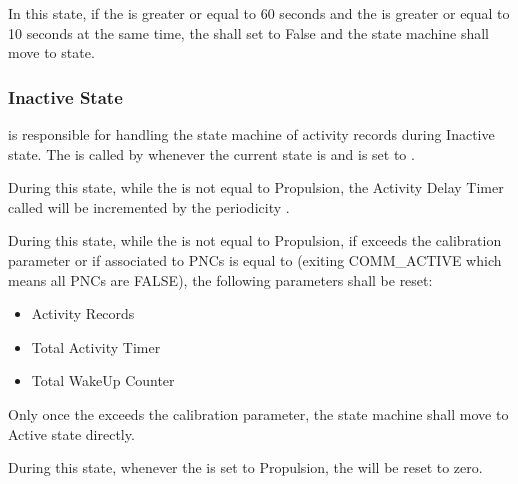 {In this state, if the  is greater or equal to 60 seconds and the  is greater or equal to 10 seconds at the same time,
the  shall set to False and the state machine shall move to  state.}
{ }



\subsubsection{Inactive State}
\label{subsec:inactive_state}
{ is responsible for handling the state machine of activity records during Inactive state. 
The  is called by  whenever the current state is  and  is set to .}
{}

{During this state, while the  is not equal to Propulsion, the Activity Delay Timer called  will be incremented by the periodicity .}
{  }

{During this state, while the  is not equal to Propulsion, if  exceeds the  calibration parameter or if  associated to PNCs is equal to  (exiting COMM_ACTIVE which means all PNCs are FALSE), the following parameters shall be reset:
\begin{itemize}
	\item Activity Records
	\item Total Activity Timer
	\item Total WakeUp Counter
\end{itemize}
Only once the  exceeds the  calibration parameter, the state machine shall move to Active state directly.
}
{ }

{During this state, whenever the  is set to Propulsion, the  will be reset to zero.}
{}



